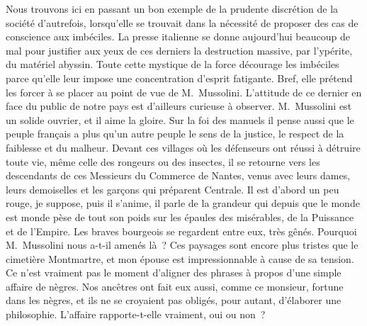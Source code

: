 \documentclass[french,twoside]{book} %
\newcommand{\astertri}{\medskip\par\centerline{\color{rubric}\large\selectfont{\syms ✻\,✻\,✻}}\medskip\par}%
\begin{document}
\noindent Nous trouvons ici en passant un bon exemple de la prudente discrétion de la société d’autrefois, lorsqu’elle se trouvait dans la nécessité de proposer des cas de conscience aux imbéciles. La presse italienne se donne aujourd’hui beaucoup de mal pour justifier aux yeux de ces derniers la destruction massive, par l’ypérite, du matériel abyssin. Toute cette mystique de la force décourage les imbéciles parce qu’elle leur impose une concentration d’esprit fatigante. Bref, elle prétend les forcer à se placer au point de vue de M. Mussolini. L’attitude de ce dernier en face du public de notre pays est d’ailleurs curieuse à observer. M. Mussolini est un solide ouvrier, et il aime la gloire. Sur la foi des manuels il pense aussi que le peuple français a plus qu’un autre peuple le sens de la justice, le respect de la faiblesse et du malheur. Devant ces villages où les défenseurs ont réussi à détruire toute vie, même celle des rongeurs ou des insectes, il se retourne vers les descendants de ces Messieurs du Commerce de Nantes, venus avec leurs dames, leurs demoiselles et les garçons qui préparent Centrale. Il est d’abord un peu rouge, je suppose, puis il s’anime, il parle de la grandeur qui depuis que le monde est monde pèse de tout son poids sur les épaules des misérables, de la Puissance et de l’Empire. Les braves bourgeois se regardent entre eux, très gênés. Pourquoi M. Mussolini nous a-t-il amenés là ? Ces paysages sont encore plus tristes que le cimetière Montmartre, et mon épouse est impressionnable à cause de sa tension. Ce n’est vraiment pas le moment d’aligner des phrases à propos d’une simple affaire de nègres. Nos ancêtres ont fait eux aussi, comme ce monsieur, fortune dans les nègres, et ils ne se croyaient pas obligés, pour autant, d’élaborer une philosophie. L’affaire rapporte-t-elle vraiment, oui ou non ?\par

\astertri
\end{document}
